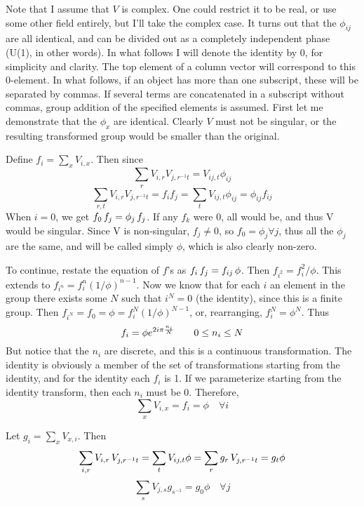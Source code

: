 \documentclass[12pt]{article}
\begin{document}
Note that I assume that $V$ is complex.  One could restrict it to
be real, or use some other field entirely, but I'll take the
complex case.  It turns out that the $\phi_{ij}$ are
all identical, and can be divided out as a completely independent phase
(U(1), in other words).
In what follows I will denote the
identity by 0, for simplicity and clarity.  The top element of a column
vector will correspond to this 0-element.  In what follows, if an
object has more than one subscript, these will be separated by commas.
If several terms are concatenated in a subscript without commas,
group addition of the specified elements is assumed.
  First let me demonstrate that the $\phi_x$ are identical.
Clearly $V$ must not be singular, or the
resulting transformed group would be smaller than the original.

 Define $f_i = \sum_{x} V_{i,x}$.  Then since
$$
\sum_{r} V_{i,r} V_{j,r^{-1}t} = V_{ij,t} \phi_{ij}
$$
$$
\sum_{r,t} V_{i,r} V_{j,r^{-1}t} = f_i f_j = \sum_{t} V_{ij,t} \phi_{ij} =
\phi_{ij} f_{ij}
$$
When $i = 0$, we get $f_0 \thinspace f_j = \phi_j \thinspace f_j$.
If any $f_k$ were 0, all would be, and thus V would be singular.
Since V is non-singular,
$f_j \neq 0$, so $f_0 = \phi_j \forall j$, thus all the $\phi_j$ are the
same, and will be called simply $\phi$, which is also clearly non-zero.

 To continue, restate the equation of $f$'s as $f_i \thinspace f_j =
f_{ij} \thinspace \phi$.  Then $f_{i^2} = f^2_i /\phi$.  This extends
to $f_{i^n} = f^n_i (1/\phi)^{n-1}$.  Now we know that for each $i$
an element in the group
there exists some $N$ such that $i^N = 0$ (the identity), since this
is a finite group.  Then $f_{i^N} = f_0 = \phi = f^N_i (1/\phi)^{N-1}$,
or, rearranging, $f^N_i = \phi^N$.  Thus
$$
f_i = \phi e^{2 i \pi {n_i \over N}} \quad\quad 0 \leq n_i \leq N
$$
But notice that the $n_i$ are discrete, and this is a continuous
transformation.  The identity is obviously a member of the set of 
transformations starting from the identity,
and for the identity each
$f_i$ is 1.  If we parameterize starting from the identity transform, then 
each $n_i$ must be $0$.  Therefore,
$$
\sum_x V_{i,x} = f_i = \phi \quad \forall i
$$

 Let $g_i = \sum_x V_{x,i}$.  Then
$$
\sum_{i,r} V_{i,r} \thinspace V_{j,r^{-1}t} = \sum_t V_{ij,t} \phi =
\sum_r g_r \thinspace V_{j,r^{-1}t} = g_t \phi
$$
$$
\sum_{s} V_{j,s} g_{s^{-1}} = g_0 \phi \quad \forall j
$$
\end{document}
